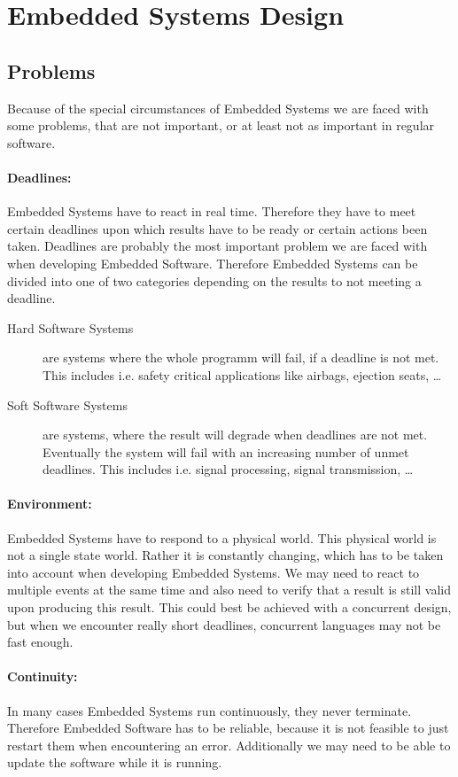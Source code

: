 \documentclass[10pt,a4paper,titlepage,draft]{article} %
\begin{document}
\section{Embedded Systems Design}
\subsection{Problems}
Because of the special circumstances of Embedded Systems we are faced with some problems, that are not important, or at least not as important in regular software.

\paragraph{Deadlines:}
Embedded Systems have to react in real time.
Therefore they have to meet certain deadlines upon which results have to be ready or certain actions been taken.
Deadlines are probably the most important problem we are faced with when developing Embedded Software.
Therefore Embedded Systems can be divided into one of two categories depending on the results to not meeting a deadline.

\begin{description}
	\item[Hard Software Systems] are systems where the whole programm will fail, if a deadline is not met.
	This includes i.e. safety critical applications like airbags, ejection seats, \dots
	\item[Soft Software Systems] are systems, where the result will degrade when deadlines are not met.
	Eventually the system will fail with an increasing number of unmet deadlines. This includes i.e. signal processing, signal transmission, \dots
\end{description}

\paragraph{Environment:}
Embedded Systems have to respond to a physical world. This physical world is not a single state world.
Rather it is constantly changing, which has to be taken into account when developing Embedded Systems.
We may need to react to multiple events at the same time and also need to verify that a result is still valid upon producing this result.
This could best be achieved with a concurrent design, but when we encounter really short deadlines, concurrent languages may not be fast enough.

\paragraph{Continuity:}
In many cases Embedded Systems run continuously, they never terminate.
Therefore Embedded Software has to be reliable, because it is not feasible to just restart them when encountering an error.
Additionally we may need to be able to update the software while it is running.
\end{document}
